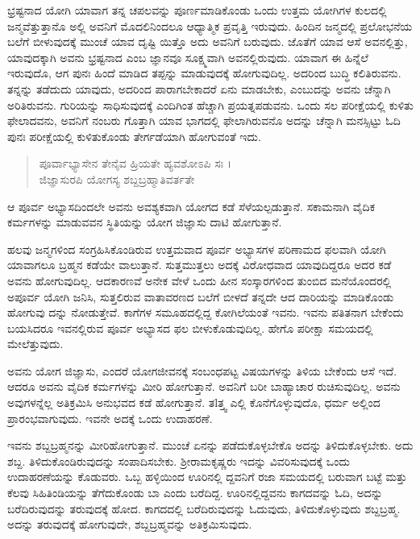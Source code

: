 ಭ್ರಷ್ಟನಾದ ಯೋಗಿ ಯಾವಾಗ ತನ್ನ ಚಪಲವನ್ನು ಪೂರ್ಣಮಾಡಿಕೊಂಡು ಒಂದು ಉತ್ತಮ ಯೋಗಿಗಳ ಕುಲದಲ್ಲಿ ಜನ್ಮವೆತ್ತುತ್ತಾನೊ ಅಲ್ಲಿ ಅವನಿಗೆ ಮೊದಲಿನಿಂದಲೂ ಆಧ್ಯಾತ್ಮಿಕ ಪ್ರವೃತ್ತಿ ಇರುವುದು. ಹಿಂದಿನ ಜನ್ಮದಲ್ಲಿ ಪ್ರಲೋಭನೆಯ ಬಲೆಗೆ ಬೀಳುವುದಕ್ಕೆ ಮುಂಚೆ ಯಾವ ದೃಷ್ಟಿ ಯಿತ್ತೊ ಅದು ಅವನಿಗೆ ಬರುವುದು. ಜೊತೆಗೆ ಯಾವ ಆಸೆ ಅವನಲ್ಲಿತ್ತು, ಯಾವುದಕ್ಕಾಗಿ ಅವನು ಭ್ರಷ್ಟನಾದ ಎಂಬ ಜ್ಞಾನವೂ ಸೂಕ್ಷ್ಮವಾಗಿ ಅವನಲ್ಲಿರುವುದು. ಯಾವಾಗ ಈ ಹಿನ್ನೆಲೆ ಇರುವುದೊ, ಆಗ ಪುನಃ ಹಿಂದೆ ಮಾಡಿದ ತಪ್ಪನ್ನು ಮಾಡುವುದಕ್ಕೆ ಹೋಗುವುದಿಲ್ಲ. ಅದರಿಂದ ಬುದ್ಧಿ ಕಲಿತಿರುವನು. ತನ್ನನ್ನು ತಡೆದುದು ಯಾವುದು, ಅದರಿಂದ ಪಾರಾಗಬೇಕಾದರೆ ಏನು ಮಾಡಬೇಕು, ಎಂಬುದನ್ನು ಅವನು ಚೆನ್ನಾಗಿ ಅರಿತಿರುವನು. ಗುರಿಯನ್ನು ಸಾಧಿಸುವುದಕ್ಕೆ ಎಂದಿಗಿಂತ ಹೆಚ್ಚಾಗಿ ಪ್ರಯತ್ನಪಡುವನು. ಒಂದು ಸಲ ಪರೀಕ್ಷೆಯಲ್ಲಿ ಕುಳಿತು ಫೇಲಾದವನು, ಅವನಿಗೆ ನಂಬರು ಗೊತ್ತಾಗಿ ಯಾವ ಭಾಗದಲ್ಲಿ ಫೇಲಾಗಿರುವನೊ ಅದನ್ನು ಚೆನ್ನಾಗಿ ಮನಸ್ಸಿಟ್ಟು ಓದಿ ಪುನಃ ಪರೀಕ್ಷೆಯಲ್ಲಿ ಕುಳಿತುಕೊಂಡು ತೇರ್ಗಡೆಯಾಗಿ ಹೋಗುವಂತೆ ಇದು.

\begin{verse}
ಪೂರ್ವಾಭ್ಯಾಸೇನ ತೇನೈವ ಹ್ರಿಯತೇ ಹ್ಯವಶೋಽಪಿ ಸಃ ।\\ಜಿಜ್ಞಾಸುರಪಿ ಯೋಗಸ್ಯ ಶಬ್ದಬ್ರಹ್ಮಾತಿವರ್ತತೇ 
\end{verse}

{\small ಆ ಪೂರ್ವ ಅಭ್ಯಾಸದಿಂದಲೇ ಅವನು ಅವಶ್ಯಕವಾಗಿ ಯೋಗದ ಕಡೆ ಸೆಳೆಯಲ್ಪಡುತ್ತಾನೆ. ಸಕಾಮನಾಗಿ ವೈದಿಕ ಕರ್ಮಗಳನ್ನು ಮಾಡುವವನ ಸ್ಥಿತಿಯನ್ನು ಯೋಗ ಜಿಜ್ಞಾಸು ದಾಟಿ ಹೋಗುತ್ತಾನೆ.}

ಹಲವು ಜನ್ಮಗಳಿಂದ ಸಂಗ್ರಹಿಸಿಕೊಂಡಿರುವ ಉತ್ತಮವಾದ ಪೂರ್ವ ಅಭ್ಯಾಸಗಳ ಪರಿಣಾಮದ ಫಲವಾಗಿ ಯೋಗಿ ಯಾವಾಗಲೂ ಬ್ರಹ್ಮನ ಕಡೆಯೇ ವಾಲುತ್ತಾನೆ. ಸುತ್ತಮುತ್ತಲು ಅದಕ್ಕೆ ವಿರೋಧವಾದ ಯಾವುದಿದ್ದರೂ ಅದರ ಕಡೆ ಅವನು ಹೋಗುವುದಿಲ್ಲ. ಆದಕಾರಣವೆ ಅನೇಕ ವೇಳೆ ಒಂದು ಹೀನ ಸಂಸ್ಕಾರಗಳಿಂದ ತುಂಬಿದ ಮನೆಯೊಂದರಲ್ಲಿ ಅಪೂರ್ವ ಯೋಗಿ ಜನಿಸಿ, ಸುತ್ತಲಿರುವ ವಾತಾವರಣದ ಬಲೆಗೆ ಬೀಳದೆ ತನ್ನದೇ ಆದ ದಾರಿಯನ್ನು ಮಾಡಿಕೊಂಡು ಹೋಗುವು ದನ್ನು ನೋಡುತ್ತೇವೆ. ಕಾಗೆಗಳ ಸಮೂಹದಲ್ಲಿದ್ದ ಕೋಗಿಲೆಯಂತೆ ಇವನು. ಇವನು ಪತಿತನಾಗ ಬೇಕೆಂದು ಬಯಸಿದರೂ ಇವನಲ್ಲಿರುವ ಪೂರ್ವ ಅಭ್ಯಾಸದ ಫಲ ಬೀಳುಕೊಡುವುದಿಲ್ಲ. ಹೇಗೊ ಪರೀಕ್ಷಾ ಸಮಯದಲ್ಲಿ ಮೇಲೆತ್ತುವುದು.

ಅವನು ಯೋಗ ಜಿಜ್ಞಾಸು, ಎಂದರೆ ಯೋಗಜೀವನಕ್ಕೆ ಸಂಬಂಧಪಟ್ಟ ವಿಷಯಗಳನ್ನು ತಿಳಿಯ ಬೇಕೆಂದು ಆಸೆ ಇದೆ. ಆದರೂ ಅವನು ವೈದಿಕ ಕರ್ಮಗಳನ್ನು ಮೀರಿ ಹೋಗುತ್ತಾನೆ. ಅವನಿಗೆ ಬರೀ ಬಾಹ್ಯಾಚಾರ ರುಚಿಸುವುದಿಲ್ಲ. ಅವನು ಅವುಗಳನ್ನೆಲ್ಲ ಅತಿಕ್ರಮಿಸಿ ಅನುಭವದ ಕಡೆ ಹೋಗುತ್ತಾನೆ. ತlತ್ತ್ವ ಎಲ್ಲಿ ಕೊನೆಗೊಳ್ಳುವುದೊ, ಧರ್ಮ ಅಲ್ಲಿಂದ ಪ್ರಾರಂಭವಾಗುವುದು. ಇವನೇ ಅದಕ್ಕೆ ಒಂದು ಉದಾಹರಣೆ.

ಇವನು ಶಬ್ದಬ್ರಹ್ಮನನ್ನು ಮೀರಿಹೋಗುತ್ತಾನೆ. ಮುಂಚೆ ಏನನ್ನು ಪಡೆದುಕೊಳ್ಳಬೇಕೊ ಅದನ್ನು ತಿಳಿದುಕೊಳ್ಳಬೇಕು. ಅದು ಶಬ್ದ. ತಿಳಿದುಕೊಂಡಿರುವುದನ್ನು ಸಂಪಾದಿಸಬೇಕು. ಶ್ರೀರಾಮಕೃಷ್ಣರು ಇದನ್ನು ವಿವರಿಸುವುದಕ್ಕೆ ಒಂದು ಉದಾಹರಣೆಯನ್ನು ಕೊಡುವರು. ಒಬ್ಬ ಹಳ್ಳಿಯಿಂದ ಊರಿನಲ್ಲಿ ದ್ದವನಿಗೆ ರಜಾ ಸಮಯದಲ್ಲಿ ಬರುವಾಗ ಬಟ್ಟೆ ಮತ್ತು ಕೆಲವು ಸಿಹಿತಿಂಡಿಯನ್ನು ತೆಗೆದುಕೊಂಡು ಬಾ ಎಂದು ಬರೆದಿದ್ದ. ಊರಿನಲ್ಲಿದ್ದವನು ಕಾಗದವನ್ನು ಓದಿ, ಅದನ್ನು ಬರೆದಿರುವುದನ್ನು ತರುವುದಕ್ಕೆ ಹೋದ. ಕಾಗದದಲ್ಲಿ ಬರೆದಿರುವುದನ್ನು ಓದುವುದು, ತಿಳಿದುಕೊಳ್ಳುವುದು ಶಬ್ದಬ್ರಹ್ಮ. ಅದನ್ನು ತರುವುದಕ್ಕೆ ಹೋಗುವುದೇ, ಶಬ್ದಬ್ರಹ್ಮವನ್ನು ಅತಿಕ್ರಮಿಸುವುದು.

